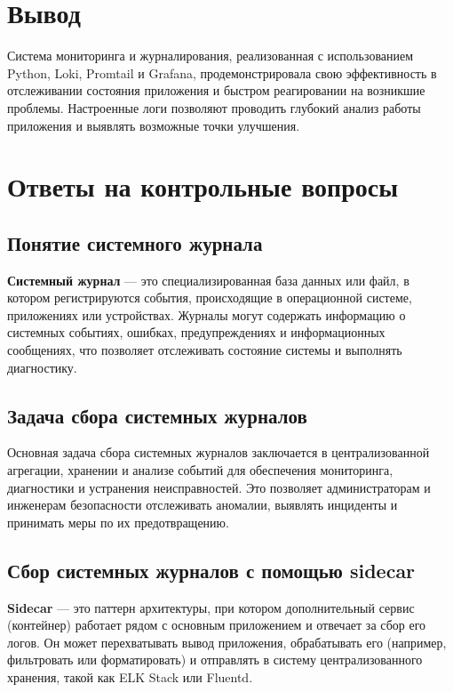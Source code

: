 \section*{Вывод}

Система мониторинга и журналирования,
реализованная с использованием Python, Loki, Promtail и Grafana,
продемонстрировала свою эффективность в отслеживании состояния приложения
и быстром реагировании на возникшие проблемы.
Настроенные логи позволяют проводить глубокий анализ работы приложения
и выявлять возможные точки улучшения.

\clearpage

\section*{Ответы на контрольные вопросы}

\subsection*{Понятие системного журнала}

\textbf{Системный журнал} --- это специализированная база данных или файл,
в котором регистрируются события, происходящие в операционной системе,
приложениях или устройствах.
Журналы могут содержать информацию о системных событиях, ошибках,
предупреждениях и информационных сообщениях,
что позволяет отслеживать состояние системы и выполнять диагностику.

\subsection*{Задача сбора системных журналов}

Основная задача сбора системных журналов заключается
в централизованной агрегации, хранении
и анализе событий для обеспечения мониторинга,
диагностики и устранения неисправностей.
Это позволяет администраторам и инженерам безопасности отслеживать аномалии,
выявлять инциденты и принимать меры по их предотвращению.

\subsection*{Сбор системных журналов с помощью sidecar}

\textbf{Sidecar} --- это паттерн архитектуры,
при котором дополнительный сервис (контейнер) работает рядом
с основным приложением и отвечает за сбор его логов.
Он может перехватывать вывод приложения, обрабатывать его
(например, фильтровать или форматировать)
и отправлять в систему централизованного хранения,
такой как ELK Stack или Fluentd.

